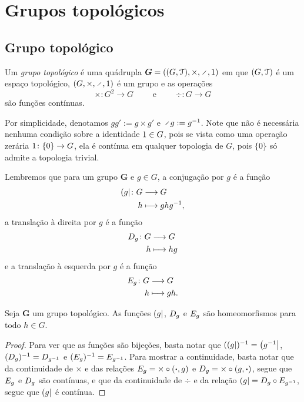 \chapter{Grupos topológicos}

\section{Grupo topológico}

\begin{definition}
Um \emph{grupo topológico} é uma quádrupla $\bm G = ((G,\topo),\times,\div,\id)$ em que $(G,\mathcal{T})$ é um espaço topológico, $(G,\times,\div,\id)$ é um grupo e as operações
	\begin{equation*}
	\times\colon G^2 \to G \qquad\text{\ \ e\ \ }\qquad \div\colon G \to G
	\end{equation*}
são funções contínuas.%
\end{definition}

Por simplicidade, denotamos $gg' := g \times g'$ e $\div g := g\inv$. Note que não é necessária nenhuma condição sobre a identidade $1 \in G$, pois se vista como uma operação zerária $1\colon \{0\} \to G$, ela é contínua em qualquer topologia de $G$, pois $\{0\}$ só admite a topologia trivial.

Lembremos que para um grupo $\bm G$ e $g \in G$, a conjugação por $g$ é a função
	\begin{align*}
	{\left({g}\right|}\colon {G} &\longrightarrow {G} \\{h} &\longmapsto ghg^{-1},
	\end{align*}
a translação à direita por $g$ é a função
	\begin{align*}
	{D_{g}}\colon {G} &\longrightarrow {G} \\{h} &\longmapsto hg
	\end{align*}
e a translação à esquerda por $g$ é a função
	\begin{align*}
	{E_{g}}\colon {G} &\longrightarrow {G} \\{h} &\longmapsto gh.
	\end{align*}

\begin{proposition}
Seja $\bm G$ um grupo topológico. As funções $\left({g}\right|$, $D_{g}$ e $E_{g}$ são homeomorfismos para todo $h \in G$.
\end{proposition}
\begin{proof}
Para ver que as funções são bijeções, basta notar que $(\left({g}\right|)^{-1} = \left({g ^{-1}}\right|$, $(D_{g})^{-1} = D_{g ^{-1}}$ e $(E_{g})^{-1} = E_{g ^{-1}}$. Para mostrar a continuidade, basta notar que da continuidade de $\times$ e das relações $E_{g} = \times \circ (\bm{\cdot},g)$ e $D_{g} = \times \circ (g,\bm{\cdot})$, segue que $E_{g}$ e $D_{g}$ são contínuas, e que da continuidade de $\div$ e da relação $\left({g}\right| = D_{g} \circ E_{g^{-1}}$, segue que $\left({g}\right|$ é contínua.
\end{proof}

